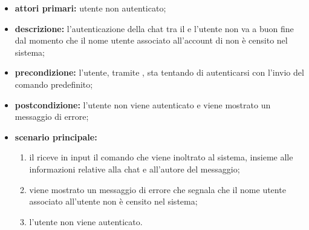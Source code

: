 	\begin{itemize}
		\item \textbf{attori primari:} utente non autenticato;
		\item \textbf{descrizione:} l'autenticazione della chat tra il  e l'utente non va a buon fine dal momento che il nome utente associato all'account di  non è censito nel sistema;
		\item \textbf{precondizione:} l'utente, tramite , sta tentando di autenticarsi con l'invio del comando predefinito;
		\item \textbf{postcondizione:} l'utente non viene autenticato e viene mostrato un messaggio di errore;
		\item \textbf{scenario principale:}
		\begin{enumerate}
			\item il   riceve in input il comando che viene inoltrato al sistema, insieme alle informazioni relative alla chat e all'autore del messaggio;
			\item viene mostrato un messaggio di errore che segnala che il nome utente associato all'utente  non è censito nel sistema;
			\item l'utente non viene autenticato.
		\end{enumerate}
	\end{itemize}
